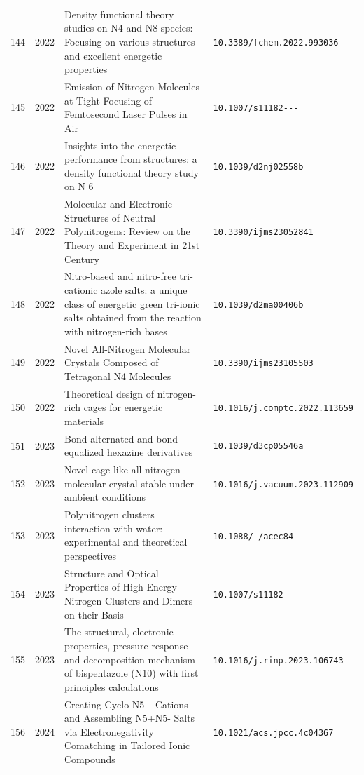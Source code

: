{\begin{longtable}{@{}cp{1.0cm}p{8.4cm}p{4.2cm}@{}}
144 & 2022 & Density functional theory studies on N4 and N8 species: Focusing on various structures and excellent energetic properties & \texttt{10.3389/\allowbreak fchem.2022.993036} \\
145 & 2022 & Emission of Nitrogen Molecules at Tight Focusing of Femtosecond Laser Pulses in Air & \texttt{10.1007/\allowbreak s11182-\allowbreak 022-\allowbreak 02499-\allowbreak 3} \\
146 & 2022 & Insights into the energetic performance from structures: a density functional theory study on N 6 & \texttt{10.1039/\allowbreak d2nj02558b} \\
147 & 2022 & Molecular and Electronic Structures of Neutral Polynitrogens: Review on the Theory and Experiment in 21st Century & \texttt{10.3390/\allowbreak ijms23052841} \\
148 & 2022 & Nitro-based and nitro-free tri-cationic azole salts: a unique class of energetic green tri-ionic salts obtained from the reaction with nitrogen-rich bases & \texttt{10.1039/\allowbreak d2ma00406b} \\
149 & 2022 & Novel All-Nitrogen Molecular Crystals Composed of Tetragonal N4 Molecules & \texttt{10.3390/\allowbreak ijms23105503} \\
150 & 2022 & Theoretical design of nitrogen-rich cages for energetic materials & \texttt{10.1016/\allowbreak j.comptc.2022.113659} \\
151 & 2023 & Bond-alternated and bond-equalized hexazine derivatives & \texttt{10.1039/\allowbreak d3cp05546a} \\
152 & 2023 & Novel cage-like all-nitrogen molecular crystal stable under ambient conditions & \texttt{10.1016/\allowbreak j.vacuum.2023.112909} \\
153 & 2023 & Polynitrogen clusters interaction with water: experimental and theoretical perspectives & \texttt{10.1088/\allowbreak 1361-\allowbreak 6463/\allowbreak acec84} \\
154 & 2023 & Structure and Optical Properties of High-Energy Nitrogen Clusters and Dimers on their Basis & \texttt{10.1007/\allowbreak s11182-\allowbreak 023-\allowbreak 02879-\allowbreak 3} \\
155 & 2023 & The structural, electronic properties, pressure response and decomposition mechanism of bispentazole (N10) with first principles calculations & \texttt{10.1016/\allowbreak j.rinp.2023.106743} \\
156 & 2024 & Creating Cyclo-N5+ Cations and Assembling N5+N5- Salts via Electronegativity Comatching in Tailored Ionic Compounds & \texttt{10.1021/\allowbreak acs.jpcc.4c04367} \\

\end{longtable}}

